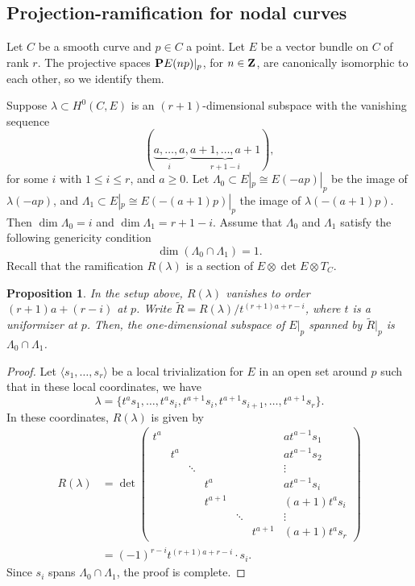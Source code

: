 \documentclass[11pt,reqno]{amsart}
\theoremstyle{plain}
\newtheorem{proposition}[theorem]{Proposition}
\theoremstyle{definition}
\theoremstyle{remark}
\numberwithin{equation}{section}
\numberwithin{equation}{section}
\begin{document}
\subsection{Projection-ramification for nodal curves}
\label{sec:prnodal}
Let $C$ be a smooth curve and $p \in C$ a point.
Let $E$ be a vector bundle on $C$ of rank $r$.
The projective spaces $\P E(np)|_p$, for $n \in \Z$, are canonically isomorphic to each other, so we identify them.

Suppose $\lambda \subset H^0(C, E)$ is an $(r+1)$-dimensional subspace with the vanishing sequence 
\begin{equation}\label{eqn:specialvs}
  (\underbrace{a, \dots, a}_{i}, \underbrace{a+1, \dots, a+1}_{r+1-i}),
\end{equation}
for some $i$ with $1 \leq i \leq r$, and $a \geq 0$.
Let $\Lambda_0 \subset E|_p \cong E(-ap)|_p$ be the image of $\lambda(-ap)$, and $\Lambda_1 \subset E|_p \cong E(-(a+1)p)|_p$ the image of $\lambda(-(a+1)p)$.
Then $\dim \Lambda_0 = i$ and $\dim \Lambda_1 = r+1-i$.
Assume that $\Lambda_0$ and $\Lambda_1$ satisfy the following genericity condition
\begin{equation}\label{eq:genericity}
  \dim (\Lambda_0 \cap \Lambda_1) = 1.
\end{equation}
Recall that the ramification $R(\lambda)$ is a section of $E \otimes \det E \otimes T_C$.
\begin{proposition}\label{prop:agreement}
  In the setup above, $R(\lambda)$ vanishes to order $(r+1)a + (r-i)$ at $p$.
  Write $\widetilde R = R(\lambda)/t^{(r+1)a + r-i}$, where $t$ is a uniformizer at $p$.
  Then, the one-dimensional subspace of $E|_p$ spanned by $\widetilde R|_p$ is $\Lambda_0 \cap \Lambda_1$.
\end{proposition}
\begin{proof}
  Let $\langle  s_1, \dots, s_r \rangle$ be a local trivialization for $E$ in an open set around $p$ such that in these local coordinates, we have
  \[ \lambda = \{t^as_1, \dots, t^as_i, t^{a+1}s_i, t^{a+1}s_{i+1}, \dots, t^{a+1}s_{r}\}.\]
  In these coordinates, $R(\lambda)$ is given by
  \begin{align*}
    R(\lambda) &= \det
    \begin{pmatrix}
      t^a & & & & & & at^{a-1}s_1\\
      & t^a & & & & &at^{a-1}s_2\\
      & & \ddots & & & &\vdots\\
      & & & t^a  & & &a t^{a-1}s_i\\
      & & & t^{a+1} & & &(a+1)t^a s_i \\
      & & & & \ddots & & \vdots\\
      & & & & &t^{a+1} &(a+1)t^{a}s_r      
    \end{pmatrix}\\
               &= (-1)^{r-i}t^{(r+1)a+r-i} \cdot s_i.
  \end{align*}
  Since $s_i$ spans $\Lambda_0 \cap \Lambda_1$, the proof is complete.
\end{proof}
\end{document}
